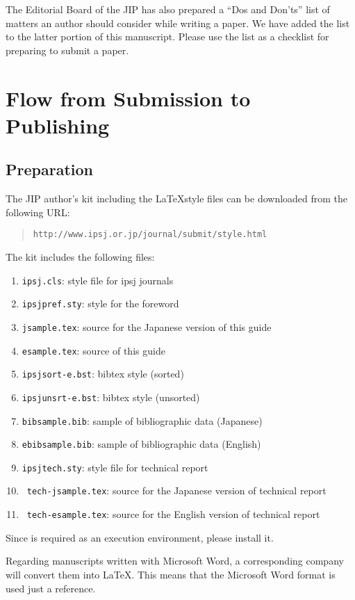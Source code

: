 \documentclass[english,preprint,JIP]{ipsj}
\def\|{\verb|}
\begin{document}
The Editorial Board of the JIP has also prepared a ``Dos and Don'ts''
list of matters an author should consider while writing a paper.  We
have added the list to the latter portion of this manuscript.  Please
use the list as a checklist for preparing to submit a paper.

%2
\section{Flow from Submission to Publishing}
%2.1
\subsection{Preparation}

The JIP author's kit including the \LaTeX style files can be downloaded
from the following URL:
\begin{quote}
 \small
 \|http://www.ipsj.or.jp/journal/submit/style.html|
\end{quote}
The kit includes the following files:
\begin{enumerate}
\item \|ipsj.cls|: style file for ipsj journals
\item \|ipsjpref.sty|: style for the foreword
\item \|jsample.tex|: source for the Japanese version of this guide
\item \|esample.tex|: source of this guide
\item \|ipsjsort-e.bst|: bibtex style (sorted)
\item \|ipsjunsrt-e.bst|: bibtex style (unsorted)
\item \|bibsample.bib|: sample of bibliographic data (Japanese)
\item \|ebibsample.bib|: sample of bibliographic data (English)

\item \|ipsjtech.sty|: style file for technical report
\item \ \|tech-jsample.tex|: source for the Japanese version of technical report
\item \ \|tech-esample.tex|: source for the English version of technical report
\end{enumerate}



Since {\LaTeXe} is required as an execution environment, please install
it.

Regarding manuscripts written with Microsoft Word, a corresponding
company will convert them into \LaTeX\@.  This means that the Microsoft
Word format is used just a reference.
\end{document}
